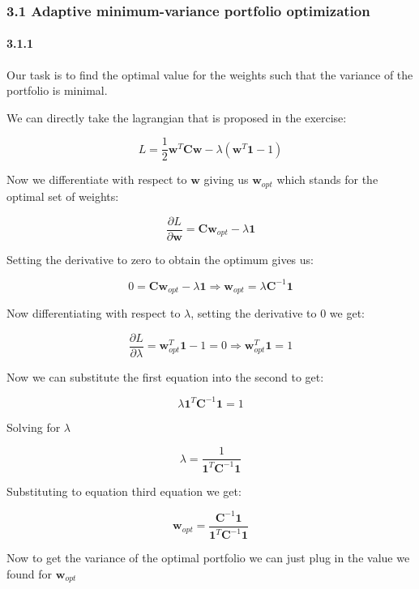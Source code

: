 \documentclass[11pt]{article}
\begin{document}
    \hypertarget{adaptive-minimum-variance-portfolio-optimization}{%
\subsubsection{3.1 Adaptive minimum-variance portfolio
optimization}\label{adaptive-minimum-variance-portfolio-optimization}}

    \hypertarget{section}{%
\paragraph{3.1.1}\label{section}}

    Our task is to find the optimal value for the weights such that the
variance of the portfolio is minimal.

We can directly take the lagrangian that is proposed in the exercise:

\[ 
L = \frac{1}{2} \textbf{w}^T\textbf{C}\textbf{w} - \lambda (\textbf{w}^T \textbf{1} - 1) 
\]

Now we differentiate with respect to \(\textbf{w}\) giving us
\(\textbf{w}_{opt}\) which stands for the optimal set of weights:

\[ 
\frac{\partial L}{ \partial \textbf{w}} = \textbf{C}\textbf{w}_{opt} - \lambda \textbf{1} 
\]

Setting the derivative to zero to obtain the optimum gives us:

\[
0 = \textbf{C}\textbf{w}_{opt} - \lambda \textbf{1} \Rightarrow \textbf{w}_{opt} = \lambda \textbf{C}^{-1} \textbf{1}
\]

Now differentiating with respect to \(\lambda\), setting the derivative
to 0 we get:

\[
\frac{\partial L}{ \partial \lambda} = \textbf{w}_{opt}^T \textbf{1} - 1 = 0 \Rightarrow \textbf{w}_{opt}^T \textbf{1} = 1 
\]

Now we can substitute the first equation into the second to get:

\[ 
\lambda \textbf{1}^T \textbf{C}^{-1} \textbf{1} = 1 
\]

Solving for \(\lambda\)

\[
\lambda = \frac{1}{\textbf{1}^T \textbf{C}^{-1} \textbf{1}}
\]

Substituting to equation third equation we get:

\[
\textbf{w}_{opt} = \frac{\textbf{C}^{-1} \textbf{1}}{\textbf{1}^T \textbf{C}^{-1} \textbf{1}}
\]

Now to get the variance of the optimal portfolio we can just plug in the
value we found for \(\textbf{w}_{opt}\)
\end{document}

